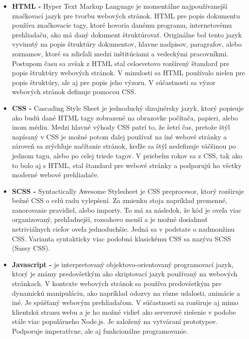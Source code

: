 \begin{itemize}
    \item \textbf{HTML -} Hyper Text Markup Language je momentálne najpoužívanejší značkovací jazyk pre tvorbu webových stránok. HTML pre popis dokumentu používa značkovacie tagy, ktoré hovoria danému programu, internetovému prehliadaču, ako má daný dokument štruktúrovať. Originálne bol tento jazyk vyvinutý na popis štruktúry dokumentov, hlavne nadpisov, paragrafov, alebo zoznamov, ktoré sa zdieľali medzi inštitúciami a vedeckými pracovníkmi. Postupom času sa avšak z HTML stal celosvetovo rozšírený štandard pre popis štruktúry webových stránok. V minulosti sa HTML používalo nielen pre popis štruktúry, ale aj pre popis jeho výzoru. V súčastnosti sa výzor webových stránok definuje pomocou CSS. \cite{fswG1WVQQnoCa64c}
    \item \textbf{CSS -} Cascading Style Sheet je jednoduchý dizajnérsky jazyk, ktorý popisuje ako budú dané HTML tagy zobrazené na obrazovke počítača, papieri, alebo inom médiu. Medzi hlavné výhody CSS patrí to, že šetrí čas, pretože štýl napísaný v CSS je možné potom ďalej používať na iné webové stránky a zároveň sa zrýchľuje načítanie stránok, keďže sa štýl nedefinuje väčšinou po jednom tagu, alebo po celej triede tagov. V priebehu rokov sa z CSS, tak ako to bolo aj s HTML, stal štandard pre webové stránky a podporujú ho všetky moderné webové prehliadače. \cite{VNZJ2nmvOm16rWtR}
    \item \textbf{SCSS -} Syntactically Awesome Stylesheet je CSS preprocesor, ktorý rozširuje bežné CSS o celú radu vylepšení. Za zmienku stoja napríklad premenné, zanorovanie pravidiel, alebo importy. To má za následok, že kód je oveľa viac organizovaný, prehľadnejší, rozsahovo menší a je možné dosiahnuť netriviálnych cieľov oveľa jednoduchšie. Jedná sa v podstate o nadmonžinu CSS. Varianta syntakticky viac podobná klasickému CSS sa nazýva SCSS (Sassy CSS). \cite{SIWRi1jHe5vClhda}
    \item \textbf{Javascript -} je interpretovaný objektovo-orientovaný programovací jazyk, ktorý je známy predovšetkým ako skriptovací jazyk používaný na webových stránkach. V kontexte webových stránok sa používa predovšetkým pre dynamickú manipuláciu, ako napríklad odozvy na rôzne udalosti, animácie a iné. Je spúšťaný webovým prehliadačom. V súčastnosti sa rozširuje aj mimo klientskú stranu webu a je ho možné vidieť ako serverové riešenie v podobe stále viac populárneho Node.js. Je založený na vytváraní prototypov. Podporuje imperatívne, ale aj funkcionálne programovanie. \cite{mpahm68E0P8GyL7C}

\end{itemize}
